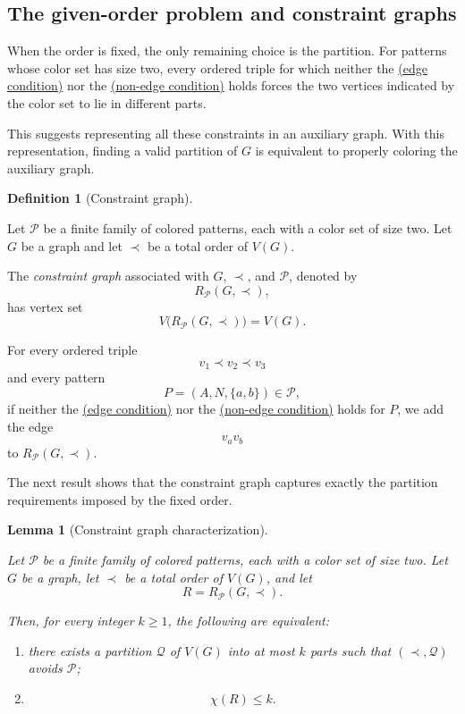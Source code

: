 \documentclass[12pt]{article}
\theoremstyle{plain}
\newtheorem{lemma}[theorem]{Lemma}
\theoremstyle{definition}
\newtheorem{definition}[theorem]{Definition}
\theoremstyle{remark}
\theoremstyle{definition}
\newcommand{\edgecondition}{%
  \hyperref[def:avoid:cond:edge]{(edge condition)}\xspace
}
\newcommand{\nonedgecondition}{%
  \hyperref[def:avoid:cond:nonedge]{(non-edge condition)}\xspace
}
\begin{document}
\subsection{The given-order problem and constraint graphs}
\label{subsec:constraint-graphs}

When the order is fixed, the only remaining choice is the partition.
For patterns whose color set has size two, every ordered triple for which
neither the \edgecondition{} nor the \nonedgecondition{} holds forces the two
vertices indicated by the color set to lie in different parts.

This suggests representing all these constraints in an auxiliary graph.
With this representation, finding a valid partition of \(G\) is equivalent
to properly coloring the auxiliary graph.





\begin{definition}[Constraint graph]
\label{def:constraint-graph}

Let \(\mathcal P\) be a finite family of colored patterns, each with a color
set of size two. Let \(G\) be a graph and let \(\prec\) be a total order of
\(V(G)\).

The \emph{constraint graph} associated with \(G\), \(\prec\), and
\(\mathcal P\), denoted by
\[
R_{\mathcal P}(G,\prec),
\]
has vertex set
\[
V\bigl(R_{\mathcal P}(G,\prec)\bigr)=V(G).
\]

For every ordered triple
\[
v_1\prec v_2\prec v_3
\]
and every pattern
\[
P=(A,N,\{a,b\})\in\mathcal P,
\]
if neither the \edgecondition{} nor the \nonedgecondition{} holds for
\(P\), we add the edge
\[
v_av_b
\]
to \(R_{\mathcal P}(G,\prec)\).
\end{definition}



The next result shows that the constraint graph captures exactly the
partition requirements imposed by the fixed order.



\begin{lemma}[Constraint graph characterization]
\label{lem:constraint-graph-characterization}

Let \(\mathcal P\) be a finite family of colored patterns, each with a color
set of size two. Let \(G\) be a graph, let \(\prec\) be a total order of
\(V(G)\), and let
\[
R=R_{\mathcal P}(G,\prec).
\]

Then, for every integer \(k\ge1\), the following are equivalent:
\begin{enumerate}
    \item there exists a partition \(\mathcal Q\) of \(V(G)\) into at most
    \(k\) parts such that \((\prec,\mathcal Q)\) avoids \(\mathcal P\);

    \item
    \[
    \chi(R)\le k.
    \]
\end{enumerate}
\end{lemma}
\end{document}
